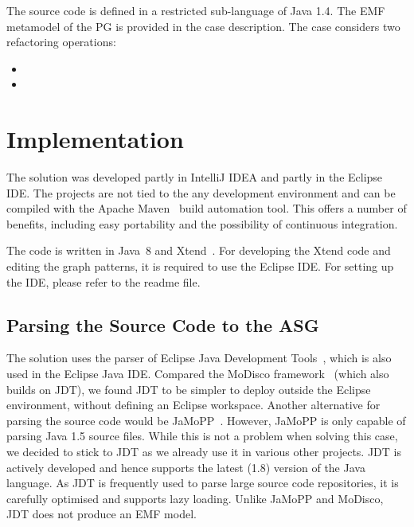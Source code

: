 \documentclass[submission,copyright,creativecommons]{eptcs}
\begin{document}
The source code is defined in a restricted sub-language of Java 1.4. The EMF metamodel of the PG is provided in the case description. The case considers two refactoring operations:

\begin{itemize}[noitemsep]
\item {}
\item {}
\end{itemize}

\section{Implementation}

The solution was developed partly in IntelliJ IDEA and partly in the Eclipse IDE. The projects are not tied to the any development environment and can be compiled with the Apache Maven~\cite{Maven} build automation tool. This offers a number of benefits, including easy portability and the possibility of continuous integration.

The code is written in Java~8 and Xtend~\cite{Xtend}. For developing the Xtend code and editing the graph patterns, it is required to use the Eclipse IDE. For setting up the IDE, please refer to the readme file. 


\subsection{Parsing the Source Code to the ASG}

The solution uses the parser of Eclipse Java Development Tools~\cite{jdt}, which is also used in the Eclipse Java IDE. Compared the MoDisco framework~\cite{MoDisco} (which also builds on JDT), we found JDT to be simpler to deploy outside the Eclipse environment, \ie without defining an Eclipse workspace. Another alternative for parsing the source code would be JaMoPP~\cite{JaMoPP}. However, JaMoPP is only capable of parsing Java 1.5 source files. While this is not a problem when solving this case, we decided to stick to JDT as we already use it in various other projects. JDT is actively developed and hence supports the latest (1.8) version of the Java language. As JDT is frequently used to parse large source code repositories, it is carefully optimised and supports lazy loading. Unlike JaMoPP and MoDisco, JDT does not produce an EMF model.
\end{document}
